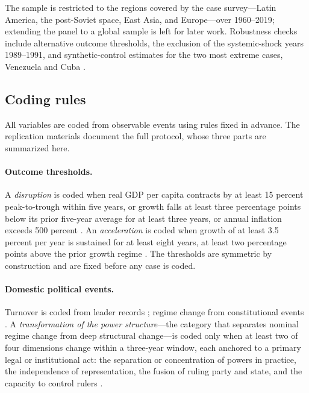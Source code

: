 \documentclass[11pt]{article}
\begin{document}
The sample is restricted to the regions covered by the case survey---Latin America, the post-Soviet space, East Asia, and Europe---over 1960--2019; extending the panel to a global sample is left for later work. Robustness checks include alternative outcome thresholds, the exclusion of the systemic-shock years 1989--1991, and synthetic-control estimates for the two most extreme cases, Venezuela and Cuba \parencite{abadie_diamond_hainmueller_2010}.

\subsection{Coding rules}
\label{sec:coding}

All variables are coded from observable events using rules fixed in advance. The replication materials document the full protocol, whose three parts are summarized here.

\paragraph{Outcome thresholds.} A \emph{disruption} is coded when real GDP per capita contracts by at least 15 percent peak-to-trough within five years, or growth falls at least three percentage points below its prior five-year average for at least three years, or annual inflation exceeds 500 percent \parencite{rodrik_1999}. An \emph{acceleration} is coded when growth of at least 3.5 percent per year is sustained for at least eight years, at least two percentage points above the prior growth regime \parencite{hausmann_pritchett_rodrik_2005}. The thresholds are symmetric by construction and are fixed before any case is coded.

\paragraph{Domestic political events.} Turnover is coded from leader records \parencite{goemans_gleditsch_chiozza_2009}; regime change from constitutional events \parencite{elkins_ginsburg_melton_2009}. A \emph{transformation of the power structure}---the category that separates nominal regime change from deep structural change---is coded only when at least two of four dimensions change within a three-year window, each anchored to a primary legal or institutional act: the separation or concentration of powers in practice, the independence of representation, the fusion of ruling party and state, and the capacity to control rulers \parencite{garciatrevijano2010}.
\end{document}

